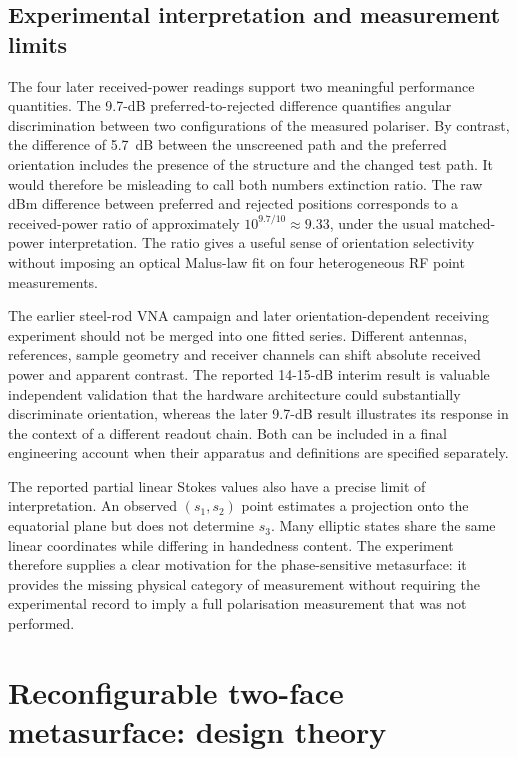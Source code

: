 \documentclass{ieeeaccess}
\begin{document}
\subsection{Experimental interpretation and measurement limits}
The four later received-power readings support two meaningful performance quantities. The 9.7-dB preferred-to-rejected difference quantifies angular discrimination between two configurations of the measured polariser. By contrast, the difference of 5.7~dB between the unscreened path and the preferred orientation includes the presence of the structure and the changed test path. It would therefore be misleading to call both numbers extinction ratio. The raw dBm difference between preferred and rejected positions corresponds to a received-power ratio of approximately $10^{9.7/10}\approx9.33$, under the usual matched-power interpretation. The ratio gives a useful sense of orientation selectivity without imposing an optical Malus-law fit on four heterogeneous RF point measurements.

The earlier steel-rod VNA campaign and later orientation-dependent receiving experiment should not be merged into one fitted series. Different antennas, references, sample geometry and receiver channels can shift absolute received power and apparent contrast. The reported 14-15-dB interim result is valuable independent validation that the hardware architecture could substantially discriminate orientation, whereas the later 9.7-dB result illustrates its response in the context of a different readout chain. Both can be included in a final engineering account when their apparatus and definitions are specified separately.

The reported partial linear Stokes values also have a precise limit of interpretation. An observed $(s_1,s_2)$ point estimates a projection onto the equatorial plane but does not determine $s_3$. Many elliptic states share the same linear coordinates while differing in handedness content. The experiment therefore supplies a clear motivation for the phase-sensitive metasurface: it provides the missing physical category of measurement without requiring the experimental record to imply a full polarisation measurement that was not performed.

\section{Reconfigurable two-face metasurface: design theory}
\end{document}
